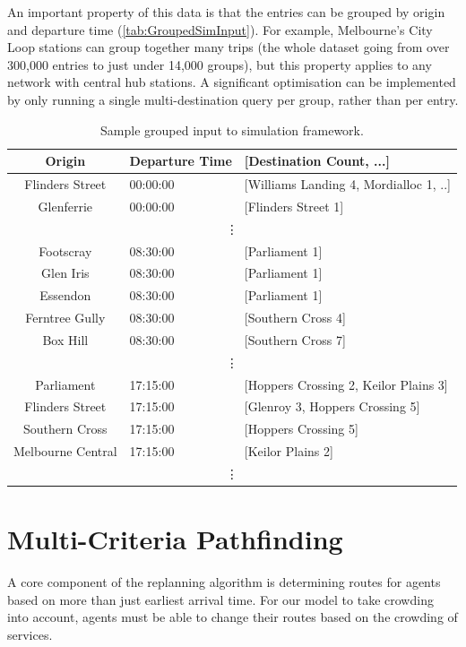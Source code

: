 An important property of this data is that the entries can be grouped by origin and departure time (\autoref{tab:GroupedSimInput}). For example, Melbourne's City Loop stations can group together many trips (the whole dataset going from over 300,000 entries to just under 14,000 groups), but this property applies to any network with central hub stations. A significant optimisation can be implemented by only running a single multi-destination query per group, rather than per entry. 

\begin{table}[ht]
    \centering
    \caption[Sample grouped input to simulation framework]{Sample grouped input to simulation framework.}
    \begin{tabular}{cll}
        Origin         & Departure Time  &  [Destination Count, ...] \\\hline
        Flinders Street & 00:00:00       &  [Williams Landing 4, Mordialloc 1, ..]\\
        Glenferrie      & 00:00:00       &  [Flinders Street 1]\\ 
        \multicolumn{3}{c}{\vdots}\\
        Footscray       &  08:30:00       &           [Parliament 1] \\
        Glen Iris       & 08:30:00    & [Parliament 1]      \\
        Essendon         & 08:30:00   & [Parliament 1]      \\
        Ferntree Gully & 08:30:00     & [Southern Cross 4]    \\
        Box Hill      & 08:30:00  & [Southern Cross 7]         \\
        \multicolumn{3}{c}{\vdots}\\
        Parliament           &  17:15:00  & [Hoppers Crossing 2, Keilor Plains 3] \\
        Flinders Street      &  17:15:00  & [Glenroy 3, Hoppers Crossing 5] \\
        Southern Cross       &  17:15:00  & [Hoppers Crossing 5] \\
        Melbourne Central    &  17:15:00  & [Keilor Plains 2] \\
        \multicolumn{3}{c}{\vdots}\\
    \end{tabular}
    \label{tab:GroupedSimInput}
\end{table}

\section{Multi-Criteria Pathfinding}
A core component of the replanning algorithm is determining routes for agents based on more than just earliest arrival time. For our model to take crowding into account, agents must be able to change their routes based on the crowding of services. 


